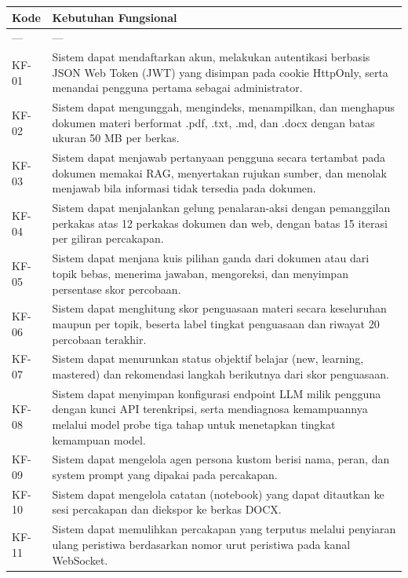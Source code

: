 \documentclass[12pt,a4paper]{article}
\begin{document}
\begin{table}[h]
\centering
\begin{tabular}{ll}
\toprule
Kode & Kebutuhan Fungsional \\
\midrule
--- & --- \\
KF-01 & Sistem dapat mendaftarkan akun, melakukan autentikasi berbasis JSON Web Token (JWT) yang disimpan pada cookie HttpOnly, serta menandai pengguna pertama sebagai administrator. \\
KF-02 & Sistem dapat mengunggah, mengindeks, menampilkan, dan menghapus dokumen materi berformat .pdf, .txt, .md, dan .docx dengan batas ukuran 50 MB per berkas. \\
KF-03 & Sistem dapat menjawab pertanyaan pengguna secara tertambat pada dokumen memakai RAG, menyertakan rujukan sumber, dan menolak menjawab bila informasi tidak tersedia pada dokumen. \\
KF-04 & Sistem dapat menjalankan gelung penalaran-aksi dengan pemanggilan perkakas atas 12 perkakas dokumen dan web, dengan batas 15 iterasi per giliran percakapan. \\
KF-05 & Sistem dapat menjana kuis pilihan ganda dari dokumen atau dari topik bebas, menerima jawaban, mengoreksi, dan menyimpan persentase skor percobaan. \\
KF-06 & Sistem dapat menghitung skor penguasaan materi secara keseluruhan maupun per topik, beserta label tingkat penguasaan dan riwayat 20 percobaan terakhir. \\
KF-07 & Sistem dapat menurunkan status objektif belajar (new, learning, mastered) dan rekomendasi langkah berikutnya dari skor penguasaan. \\
KF-08 & Sistem dapat menyimpan konfigurasi endpoint LLM milik pengguna dengan kunci API terenkripsi, serta mendiagnosa kemampuannya melalui model probe tiga tahap untuk menetapkan tingkat kemampuan model. \\
KF-09 & Sistem dapat mengelola agen persona kustom berisi nama, peran, dan system prompt yang dipakai pada percakapan. \\
KF-10 & Sistem dapat mengelola catatan (notebook) yang dapat ditautkan ke sesi percakapan dan diekspor ke berkas DOCX. \\
KF-11 & Sistem dapat memulihkan percakapan yang terputus melalui penyiaran ulang peristiwa berdasarkan nomor urut peristiwa pada kanal WebSocket. \\
\bottomrule
\end{tabular}
\end{table}
\end{document}
